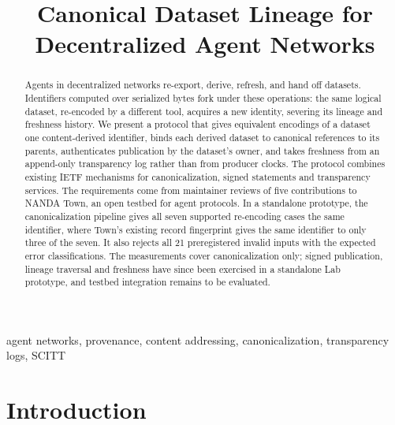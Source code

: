 \documentclass[conference]{IEEEtran}
\begin{document}
\title{Canonical Dataset Lineage for\\Decentralized Agent Networks}

\author{
}

\maketitle

\begin{abstract}
Agents in decentralized networks re-export, derive, refresh, and hand off datasets. Identifiers computed over serialized bytes fork under these operations: the same logical dataset, re-encoded by a different tool, acquires a new identity, severing its lineage and freshness history. We present a protocol that gives equivalent encodings of a dataset one content-derived identifier, binds each derived dataset to canonical references to its parents, authenticates publication by the dataset's owner, and takes freshness from an append-only transparency log rather than from producer clocks. The protocol combines existing IETF mechanisms for canonicalization, signed statements and transparency services. The requirements come from maintainer reviews of five contributions to NANDA Town, an open testbed for agent protocols. In a standalone prototype, the canonicalization pipeline gives all seven supported re-encoding cases the same identifier, where Town's existing record fingerprint gives the same identifier to only three of the seven. It also rejects all 21 preregistered invalid inputs with the expected error classifications. The measurements cover canonicalization only; signed publication, lineage traversal and freshness have since been exercised in a standalone Lab prototype, and testbed integration remains to be evaluated.
\end{abstract}

\begin{IEEEkeywords}
agent networks, provenance, content addressing, canonicalization, transparency logs, SCITT
\end{IEEEkeywords}

\section{Introduction}
\end{document}
